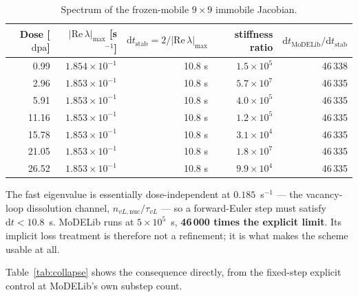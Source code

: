 \documentclass[11pt,a4paper]{article}
\newcommand{\dpa}{\ensuremath{\mathrm{dpa}}}
\begin{document}
\begin{table}[htb]
\centering
\caption{Spectrum of the frozen-mobile $9\times9$ immobile Jacobian.}
\label{tab:spectrum}
\begin{tabular}{rrrrr}
\toprule
Dose [\dpa] & $|\mathrm{Re}\,\lambda|_{\max}$ [s$^{-1}$]
& $\mathrm dt_{\mathrm{stab}}=2/|\mathrm{Re}\,\lambda|_{\max}$
& stiffness ratio & $\mathrm dt_{\mathrm{MoDELib}}/\mathrm dt_{\mathrm{stab}}$ \\
\midrule
 0.99 & $1.854\times10^{-1}$ & 10.8 s & $1.5\times10^{5}$ & 46\,338 \\
 2.96 & $1.853\times10^{-1}$ & 10.8 s & $5.7\times10^{7}$ & 46\,335 \\
 5.91 & $1.853\times10^{-1}$ & 10.8 s & $4.0\times10^{5}$ & 46\,335 \\
11.16 & $1.853\times10^{-1}$ & 10.8 s & $1.2\times10^{5}$ & 46\,335 \\
15.78 & $1.853\times10^{-1}$ & 10.8 s & $3.1\times10^{4}$ & 46\,335 \\
21.05 & $1.853\times10^{-1}$ & 10.8 s & $1.8\times10^{7}$ & 46\,335 \\
26.52 & $1.853\times10^{-1}$ & 10.8 s & $9.9\times10^{4}$ & 46\,335 \\
\bottomrule
\end{tabular}
\end{table}

The fast eigenvalue is essentially dose-independent at
$0.185$~s$^{-1}$ --- the vacancy-loop dissolution channel, $n_{vL,\mathrm{nuc}}/\tau_{vL}$
--- so a forward-Euler step must satisfy $\mathrm dt<10.8$~s. MoDELib runs at
$5\times10^{5}$~s, \textbf{46\,000 times the explicit limit}. Its implicit loss
treatment is therefore not a refinement; it is what makes the scheme usable at
all.

Table~\ref{tab:collapse} shows the consequence directly, from the fixed-step
explicit control at MoDELib's own substep count.
\end{document}
